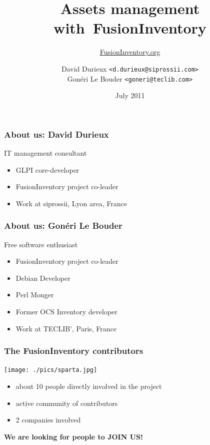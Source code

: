 \documentclass{beamer}
\title{Assets management with~FusionInventory}
\author{\href{http://www.FusionInventory.org}{FusionInventory.org}}
\date{July 2011}
\institute{\texttt{[image: ./pics/rmll2011.jpg]}}
\author{ David Durieux \texttt{<d.durieux@siprossii.com>} \\
Gonéri Le Bouder \texttt{<goneri@teclib.com>}}
\begin{document}
\frame[plain]{\titlepage}

\begin{frame}
    \frametitle{About us: David Durieux}

    \begin{block}{IT management consultant}
        \begin{itemize}
        \item GLPI core-developer
        \item FusionInventory project co-leader
        \item Work at siprossii, Lyon area, France
        \end{itemize}
    \end{block}

\end{frame}



\begin{frame}
    \frametitle{About us: Gonéri Le Bouder}


    \begin{block}{Free software enthusiast}
        \begin{itemize}
        \item FusionInventory project co-leader
        \item Debian Developer
        \item Perl Monger
        \item Former OCS Inventory developer
        \item Work at TECLIB', Paris, France
        \end{itemize}
    \end{block}

\end{frame}


\begin{frame}
    \frametitle{The FusionInventory contributors}

    \begin{center}
    \texttt{[image: ./pics/sparta.jpg]}
    \end{center}

    \begin{itemize}
    \item about 10 people directly involved in the project
    \item active community of contributors
    \item 2 companies involved
    \end{itemize}

    \pause
    \bf{We are looking for people to JOIN US!}
\end{frame}
\end{document}
